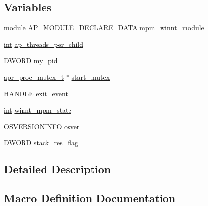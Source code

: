 \subsection*{Variables}
\begin{DoxyCompactItemize}
\item 
\hyperlink{group__APACHE__CORE__CONFIG_ga0ea4f633a5f9f88e1603aaeb1f2b2e69}{module} \hyperlink{ap__config_8h_ae2cb2b956e7f274f8d91581331debbe0}{A\+P\+\_\+\+M\+O\+D\+U\+L\+E\+\_\+\+D\+E\+C\+L\+A\+R\+E\+\_\+\+D\+A\+TA} \hyperlink{group__APACHE__MPM__WINNT_ga61813b6994442d70c7f29194efae11a3}{mpm\+\_\+winnt\+\_\+module}
\item 
\hyperlink{pcre_8txt_a42dfa4ff673c82d8efe7144098fbc198}{int} \hyperlink{group__APACHE__MPM__WINNT_ga1444d83d8c7bcd159d8af4065ded7e2c}{ap\+\_\+threads\+\_\+per\+\_\+child}
\item 
D\+W\+O\+RD \hyperlink{group__APACHE__MPM__WINNT_gaaa35aa7c755ceade0834ec1a0a12844b}{my\+\_\+pid}
\item 
\hyperlink{structapr__proc__mutex__t}{apr\+\_\+proc\+\_\+mutex\+\_\+t} $\ast$ \hyperlink{group__APACHE__MPM__WINNT_gad8dbc4e75ee7db5bf899544fbdb3b8df}{start\+\_\+mutex}
\item 
H\+A\+N\+D\+LE \hyperlink{group__APACHE__MPM__WINNT_gad98010720fc07c0fae435d2fbe843a69}{exit\+\_\+event}
\item 
\hyperlink{pcre_8txt_a42dfa4ff673c82d8efe7144098fbc198}{int} \hyperlink{group__APACHE__MPM__WINNT_gac2b776ca6ddfa1a903b0686f1429254f}{winnt\+\_\+mpm\+\_\+state}
\item 
O\+S\+V\+E\+R\+S\+I\+O\+N\+I\+N\+FO \hyperlink{group__APACHE__MPM__WINNT_ga70c14a1643ade732f8c0142e05130cb2}{osver}
\item 
D\+W\+O\+RD \hyperlink{group__APACHE__MPM__WINNT_ga06a5de2d3462ffb00e0dbbeed5be5868}{stack\+\_\+res\+\_\+flag}
\end{DoxyCompactItemize}


\subsection{Detailed Description}


\subsection{Macro Definition Documentation}
